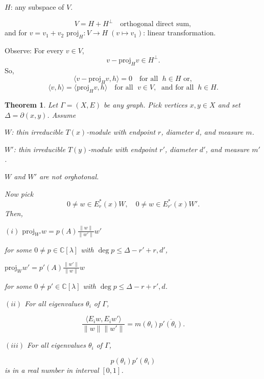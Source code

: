 \documentclass[
]{book}
\newtheorem{theorem}{Theorem}[chapter]
\theoremstyle{definition}
\theoremstyle{definition}
\theoremstyle{definition}
\theoremstyle{definition}
\theoremstyle{remark}
\begin{document}
\(H\): any subspace of \(V\).

\[V = H + H^\bot \quad \text{orthogonal direct sum},\]
and for \(v = v_1 + v_2\) \(\mathrm{proj}_H: V\to H \; (v\mapsto v_1)\): linear transformation.

Observe:
For every \(v\in V\),
\[v - \mathrm{proj}_H v \in H^\bot.\]
So,
\[\langle v - \mathrm{proj}_H v, h\rangle = 0 \quad \text{for all }\;h\in H \text{ or},\]
\[\langle v, h\rangle = \langle \mathrm{proj}_H v, h\rangle \quad \text{for all }\;v\in V, \;\text{ and for all }\: h\in H.\]

\begin{theorem}
\protect\hypertarget{thm:two-thin-modules}{}\label{thm:two-thin-modules}Let \(\Gamma = (X,E)\) be any graph. Pick vertices \(x,y\in X\) and set \(\Delta = \partial(x,y)\). Assume

\(W\): thin irreducible \(T(x)\)-module with endpoint \(r\), diameter \(d\), and measure \(m\).

\(W'\): thin irreducible \(T(y)\)-module with endpoint \(r'\), diameter \(d'\), and measure \(m'\).

\(W\) and \(W'\) are not orghotonal.

Now pick
\[0\neq w\in E^*_r(x)W, \quad 0\neq w\in E^*_{r'}(x)W'.\]
Then,

\((i)\) \({\displaystyle \mathrm{proj}_{W'}w = p(A)\frac{\|w\|}{\|w'\|}w'}\)

for some \(0\neq p\in \mathbb{C}[\lambda]\) with \(\deg p \leq \Delta - r' + r, d'\),

\({\displaystyle \mathrm{proj}_{W}w' = p'(A)\frac{\|w'\|}{\|w\|}w}\)

for some \(0\neq p'\in \mathbb{C}[\lambda]\) with \(\deg p \leq \Delta - r + r', d\).

\((ii)\) For all eigenvalues \(\theta_i\) of \(\Gamma\),

\[\frac{\langle E_iw, E_iw'\rangle}{\|w\|\|w'\|} = m(\theta_i)\overline{p'(\theta_i)}.\]

\((iii)\) For all eigenvalues \(\theta_i\) of \(\Gamma\),

\[p(\theta_i)p'(\theta_i)\]
is in a real number in interval \([0,1]\).
\end{theorem}
\end{document}

